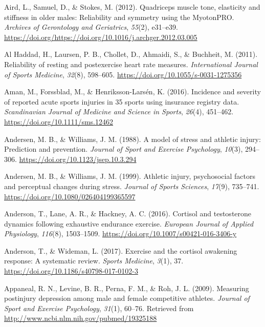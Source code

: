 \documentclass[
  english,
  man,floatsintext]{apa6}
\begin{document}
\leavevmode\hypertarget{ref-Aird2012}{}%
Aird, L., Samuel, D., \& Stokes, M. (2012). Quadriceps muscle tone, elasticity and stiffness in older males: Reliability and symmetry using the MyotonPRO. \emph{Archives of Gerontology and Geriatrics}, \emph{55}(2), e31--e39. \url{https://doi.org/https://doi.org/10.1016/j.archger.2012.03.005}

\leavevmode\hypertarget{ref-AlHaddad2011}{}%
Al Haddad, H., Laursen, P. B., Chollet, D., Ahmaidi, S., \& Buchheit, M. (2011). Reliability of resting and postexercise heart rate measures. \emph{International Journal of Sports Medicine}, \emph{32}(8), 598--605. \url{https://doi.org/10.1055/s-0031-1275356}

\leavevmode\hypertarget{ref-Aman2016}{}%
Aman, M., Forssblad, M., \& Henriksson-Larsén, K. (2016). Incidence and severity of reported acute sports injuries in 35 sports using insurance registry data. \emph{Scandinavian Journal of Medicine and Science in Sports}, \emph{26}(4), 451--462. \url{https://doi.org/10.1111/sms.12462}

\leavevmode\hypertarget{ref-Andersen1988}{}%
Andersen, M. B., \& Williams, J. M. (1988). A model of stress and athletic injury: Prediction and prevention. \emph{Journal of Sport and Exercise Psychology}, \emph{10}(3), 294--306. \url{https://doi.org/10.1123/jsep.10.3.294}

\leavevmode\hypertarget{ref-Andersen1999}{}%
Andersen, M. B., \& Williams, J. M. (1999). Athletic injury, psychosocial factors and perceptual changes during stress. \emph{Journal of Sports Sciences}, \emph{17}(9), 735--741. \url{https://doi.org/10.1080/026404199365597}

\leavevmode\hypertarget{ref-Anderson2016}{}%
Anderson, T., Lane, A. R., \& Hackney, A. C. (2016). Cortisol and testosterone dynamics following exhaustive endurance exercise. \emph{European Journal of Applied Physiology}, \emph{116}(8), 1503--1509. \url{https://doi.org/10.1007/s00421-016-3406-y}

\leavevmode\hypertarget{ref-Anderson2017}{}%
Anderson, T., \& Wideman, L. (2017). Exercise and the cortisol awakening response: A systematic review. \emph{Sports Medicine}, \emph{3}(1), 37. \url{https://doi.org/10.1186/s40798-017-0102-3}

\leavevmode\hypertarget{ref-Appaneal2009}{}%
Appaneal, R. N., Levine, B. R., Perna, F. M., \& Roh, J. L. (2009). Measuring postinjury depression among male and female competitive athletes. \emph{Journal of Sport and Exercise Psychology}, \emph{31}(1), 60--76. Retrieved from \url{http://www.ncbi.nlm.nih.gov/pubmed/19325188}
\end{document}
